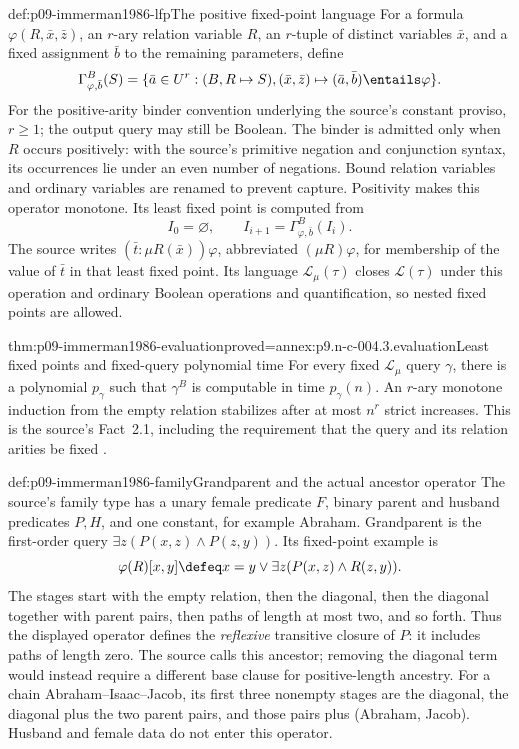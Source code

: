 \begin{hbdefinition}{def:p09-immerman1986-lfp}{The positive fixed-point language}
For a formula \(\varphi(R,\bar x,\bar z)\), an \(r\)-ary relation
variable \(R\), an \(r\)-tuple of distinct variables \(\bar x\),
and a fixed assignment \(\bar b\) to the remaining parameters, define
\[
 \Gamma_{\varphi,\bar b}^B(S)
 =\{\bar a\in U^r:(B,R\mapsto S),
                  (\bar x,\bar z)\mapsto(\bar a,\bar b)\entails\varphi\}.
\]
For the positive-arity binder convention underlying the source's
constant proviso, \(r\geq1\); the output query may still be Boolean.
The binder is admitted only when \(R\) occurs positively: with the
source's primitive negation and conjunction syntax, its occurrences lie
under an even number of negations.  Bound relation variables and ordinary
variables are renamed to prevent capture.  Positivity makes this operator
monotone.  Its least fixed point is computed from
\[
 I_0=\varnothing,\qquad I_{i+1}=\Gamma_{\varphi,\bar b}^B(I_i).
\]
The source writes \((\bar t:\mu R(\bar x))\varphi\), abbreviated
\((\mu R)\varphi\), for membership of the value of \(\bar t\)
in that least fixed point.  Its language \(\mathcal L_\mu(\tau)\)
closes \(\mathcal L(\tau)\) under this operation and ordinary Boolean
operations and quantification, so nested fixed points are allowed.
\end{hbdefinition}

\begin{hblemma}{thm:p09-immerman1986-evaluation}{proved=annex:p9.n-c-004.3.evaluation}{Least fixed points and fixed-query polynomial time}
For every fixed \(\mathcal L_\mu\) query \(\gamma\), there is a
polynomial \(p_\gamma\) such that \(\gamma^B\) is computable in
time \(p_\gamma(n)\).  An \(r\)-ary monotone induction from the
empty relation stabilizes after at most \(n^r\) strict increases.
This is the source's Fact~2.1, including the requirement that the query
and its relation arities be fixed \cite[sec.~2]{Immerman1986}.
\end{hblemma}

\begin{hbexample}{def:p09-immerman1986-family}{Grandparent and the actual ancestor operator}
The source's family type has a unary female predicate \(F\), binary
parent and husband predicates \(P,H\), and one constant, for example
Abraham.  Grandparent is the first-order query
\(\exists z(P(x,z)\land P(z,y))\).  Its fixed-point example is
\[
 \varphi(R)[x,y]\defeq x=y\lor\exists z(P(x,z)\land R(z,y)).
\]
The stages start with the empty relation, then the diagonal, then the
diagonal together with parent pairs, then paths of length at most two,
and so forth.  Thus the displayed operator defines the \emph{reflexive}
transitive closure of \(P\): it includes paths of length zero.
The source calls this ancestor; removing the diagonal term would instead
require a different base clause for positive-length ancestry.  For a
chain Abraham--Isaac--Jacob, its first three nonempty stages are the
diagonal, the diagonal plus the two parent pairs, and those pairs plus
(Abraham, Jacob).  Husband and female data do not enter this operator.
\end{hbexample}

